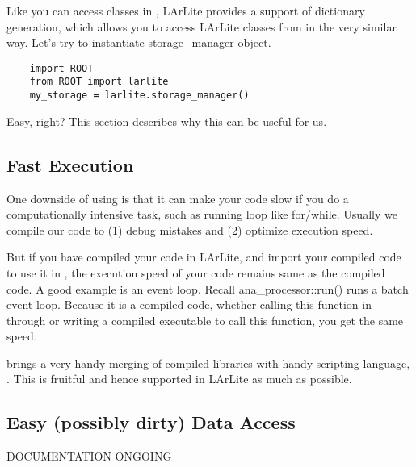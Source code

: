 Like you can access \ROOT classes in \python, LArLite provides a support of
\CINT dictionary generation, which allows you to access LArLite classes from
\python in the very similar way. Let's try to instantiate {\ttfamily storage\_manager} object.
\begin{lstlisting}
    import ROOT
    from ROOT import larlite
    my_storage = larlite.storage_manager()
\end{lstlisting}
Easy, right? This section describes why this can be useful for us.

\subsection{Fast Execution}
One downside of using \python is that it can make your code slow if you do a computationally
intensive task, such as running loop like {\ttfamily for}/{\ttfamily while}. Usually we
compile our \CPP code to (1) debug mistakes and (2) optimize execution speed.

But if you have compiled your \CPP code in LArLite, and import your compiled code to use it
in \python, the execution speed of your code remains same as the compiled code. A good example
is an event loop. Recall {\ttfamily ana\_processor::run()} runs a batch event loop. Because
it is a compiled code, whether calling this function in \python through \PyROOT or writing
a \CPP compiled executable to call this function, you get the same speed. 

\PyROOT brings a very handy merging of compiled \CPP libraries with handy scripting language, 
\python. This is fruitful and hence supported in LArLite as much as possible.

\subsection{Easy (possibly dirty) Data Access}
DOCUMENTATION ONGOING
